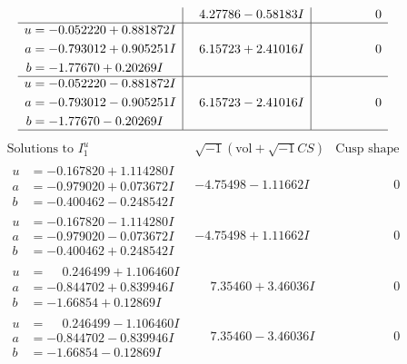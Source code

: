 \documentclass[1p]{elsarticle_modified}
\theoremstyle{definition}
\newcommand{\I}{\sqrt{-1}}
\begin{document}
$$\begin{array}{c|c|c}
 & \phantom{-}4.27786 - 0.58183 I & \phantom{-0.000000 } 0 \\ \hline\begin{aligned}
u &= -0.052220 + 0.881872 I \\
a &= -0.793012 + 0.905251 I \\
b &= -1.77670 + 0.20269 I\end{aligned}
 & \phantom{-}6.15723 + 2.41016 I & \phantom{-0.000000 } 0 \\ \hline\begin{aligned}
u &= -0.052220 - 0.881872 I \\
a &= -0.793012 - 0.905251 I \\
b &= -1.77670 - 0.20269 I\end{aligned}
 & \phantom{-}6.15723 - 2.41016 I & \phantom{-0.000000 } 0\\
 \hline 
 \end{array}$$\newpage$$\begin{array}{c|c|c}  
\text{Solutions to }I^u_{1}& \I (\text{vol} + \sqrt{-1}CS) & \text{Cusp shape}\\
 \hline 
\begin{aligned}
u &= -0.167820 + 1.114280 I \\
a &= -0.979020 + 0.073672 I \\
b &= -0.400462 - 0.248542 I\end{aligned}
 & -4.75498 - 1.11662 I & \phantom{-0.000000 } 0 \\ \hline\begin{aligned}
u &= -0.167820 - 1.114280 I \\
a &= -0.979020 - 0.073672 I \\
b &= -0.400462 + 0.248542 I\end{aligned}
 & -4.75498 + 1.11662 I & \phantom{-0.000000 } 0 \\ \hline\begin{aligned}
u &= \phantom{-}0.246499 + 1.106460 I \\
a &= -0.844702 + 0.839946 I \\
b &= -1.66854 + 0.12869 I\end{aligned}
 & \phantom{-}7.35460 + 3.46036 I & \phantom{-0.000000 } 0 \\ \hline\begin{aligned}
u &= \phantom{-}0.246499 - 1.106460 I \\
a &= -0.844702 - 0.839946 I \\
b &= -1.66854 - 0.12869 I\end{aligned}
 & \phantom{-}7.35460 - 3.46036 I & \phantom{-0.000000 } 0 \\ \hline\begin{aligned}

\end{aligned}
\end{array}$$
\end{document}
